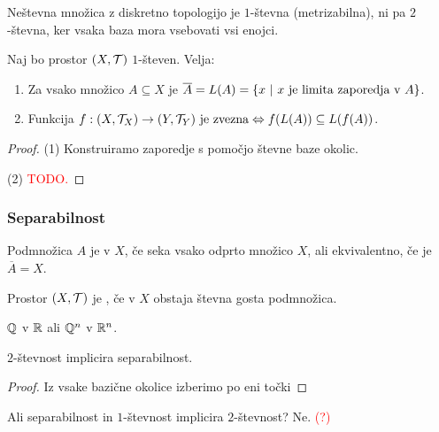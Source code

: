 \begin{primer}
    Neštevna množica z diskretno topologijo je $1$-števna (metrizabilna), ni pa $2$-števna, ker vsaka baza mora vsebovati vsi enojci.
\end{primer}

\begin{trditev}
    Naj bo prostor $(X, \mathcal{T})$ $1$-števen. Velja:
    \begin{enumerate}
        \item Za vsako množico $A \subseteq X$ je $\overline{A} = L(A) = \left\{x \ | \ x \text{ je limita zaporedja v } A\right\}$.
        \item Funkcija $f: (X, \mathcal{T}_X) \to (Y, \mathcal{T}_Y) \text{ je zvezna} \Leftrightarrow f(L(A)) \subseteq L(f(A))$.
    \end{enumerate}
\end{trditev}

\begin{proof}
    (1) Konstruiramo zaporedje s pomočjo števne baze okolic.

    (2) \textcolor{red}{TODO.}
\end{proof}

\newpage
\subsubsection{Separabilnost}
\begin{definicija}
    Podmnožica $A$ je  v $X$, če seka vsako odprto množico $X$, ali ekvivalentno, če je $\overline{A} = X$.
\end{definicija}

\begin{definicija}
    Prostor $(X, \mathcal{T})$ je , če v $X$ obstaja števna gosta podmnožica.
\end{definicija}

\begin{primer}
    $\mathbb{Q}$ v $\mathbb{R}$ ali $\mathbb{Q}^n$ v $\mathbb{R}^n$.
\end{primer}

\begin{trditev}
    $2$-števnost implicira separabilnost.
\end{trditev}

\begin{proof}
    Iz vsake bazične okolice izberimo po eni točki
\end{proof}

\begin{opomba}
    Ali separabilnost in $1$-števnost implicira $2$-števnost? Ne. \textcolor{red}{(?)}
\end{opomba}


